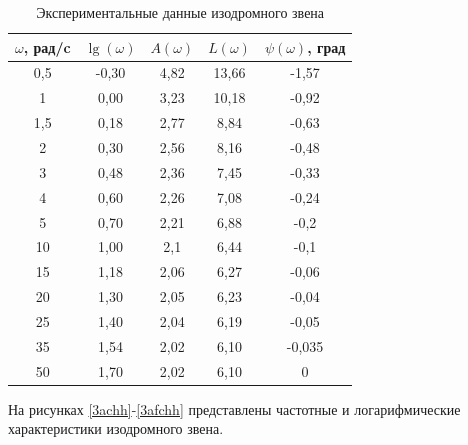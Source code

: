 \documentclass[a4paper, 12pt]{article}
\begin{document}
\begin{table}[h]
	\caption{Экспериментальные данные изодромного звена}
	\label{tab:izodr}
	\begin{tabular}{|c|c|c|c|c|}
		\hline
		$\omega$, рад/c   & $\lg(\omega)$   & $A(\omega)$ & $L(\omega)$    & $\psi(\omega)$, град   \\
		\hline
		0,5 & -0,30 & 4,82 & 13,66     & -1,57  \\
		\hline
		1   & 0,00  & 3,23 & 10,18     & -0,92  \\
		\hline
		1,5 & 0,18  & 2,77 & 8,84     & -0,63  \\
		\hline
		2   & 0,30  & 2,56 & 8,16     & -0,48  \\
		\hline
		3   & 0,48  & 2,36 & 7,45     & -0,33  \\
		\hline
		4   & 0,60  & 2,26 & 7,08     & -0,24  \\
		\hline
		5   & 0,70  & 2,21 & 6,88     & -0,2   \\
		\hline
		10  & 1,00  & 2,1  & 6,44     & -0,1   \\
		\hline
		15  & 1,18  & 2,06 & 6,27    & -0,06  \\
		\hline
		20  & 1,30  & 2,05 & 6,23    & -0,04  \\
		\hline
		25  & 1,40  & 2,04 & 6,19    & -0,05  \\
		\hline
		35  & 1,54  & 2,02 & 6,10    & -0,035 \\
		\hline
		50  & 1,70  & 2,02 & 6,10    & 0     \\
		\hline
	\end{tabular}
\end{table}

На рисунках \ref{3achh}-\ref{3afchh} представлены частотные и логарифмические характеристики изодромного звена.

\newpage
\end{document}
